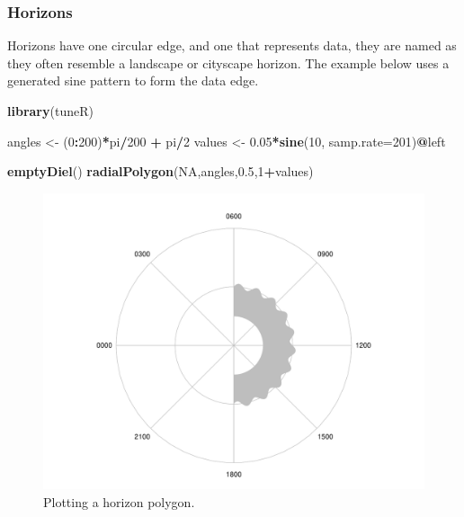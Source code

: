 \documentclass[
]{book}
\newenvironment{Shaded}{\begin{snugshade}}{\end{snugshade}}
\newcommand{\AttributeTok}[1]{\textcolor[rgb]{0.13,0.29,0.53}{#1}}
\newcommand{\ConstantTok}[1]{\textcolor[rgb]{0.56,0.35,0.01}{#1}}
\newcommand{\DecValTok}[1]{\textcolor[rgb]{0.00,0.00,0.81}{#1}}
\newcommand{\FloatTok}[1]{\textcolor[rgb]{0.00,0.00,0.81}{#1}}
\newcommand{\FunctionTok}[1]{\textcolor[rgb]{0.13,0.29,0.53}{\textbf{#1}}}
\newcommand{\NormalTok}[1]{#1}
\newcommand{\OtherTok}[1]{\textcolor[rgb]{0.56,0.35,0.01}{#1}}
\newcommand{\SpecialCharTok}[1]{\textcolor[rgb]{0.81,0.36,0.00}{\textbf{#1}}}
\begin{document}
\hypertarget{horizons}{%
\subsubsection{Horizons}\label{horizons}}

Horizons have one circular edge, and one that represents data, they are named as they often resemble a landscape or cityscape horizon. The example below uses a generated sine pattern to form the data edge.

\begin{Shaded}
\begin{Highlighting}[]
\FunctionTok{library}\NormalTok{(tuneR)}

\NormalTok{angles }\OtherTok{\textless{}{-}}\NormalTok{ (}\DecValTok{0}\SpecialCharTok{:}\DecValTok{200}\NormalTok{)}\SpecialCharTok{*}\NormalTok{pi}\SpecialCharTok{/}\DecValTok{200} \SpecialCharTok{+}\NormalTok{ pi}\SpecialCharTok{/}\DecValTok{2}
\NormalTok{values }\OtherTok{\textless{}{-}} \FloatTok{0.05}\SpecialCharTok{*}\FunctionTok{sine}\NormalTok{(}\DecValTok{10}\NormalTok{, }\AttributeTok{samp.rate=}\DecValTok{201}\NormalTok{)}\SpecialCharTok{@}\NormalTok{left}

\FunctionTok{emptyDiel}\NormalTok{()}
\FunctionTok{radialPolygon}\NormalTok{(}\ConstantTok{NA}\NormalTok{,angles,}\FloatTok{0.5}\NormalTok{,}\DecValTok{1}\SpecialCharTok{+}\NormalTok{values)}
\end{Highlighting}
\end{Shaded}

\begin{figure}

{\centering \includegraphics[width=0.9\linewidth]{_main_files/figure-latex/radialPolygon-horizon-1} 

}

\caption{Plotting a horizon polygon.}\label{fig:radialPolygon-horizon}
\end{figure}
\end{document}
